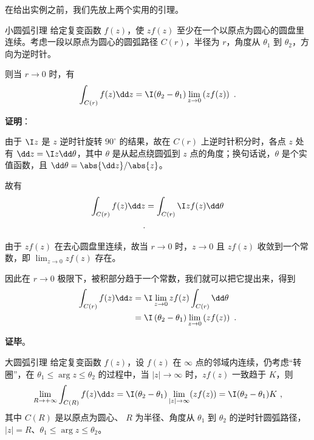 在给出实例之前，我们先放上两个实用的引理。

\begin{lemma}{小圆弧引理}\label{lem_JdLem_1}
给定复变函数 $f(z)$，使 $zf(z)$ 至少在一个以原点为圆心的圆盘里连续。考虑一段以原点为圆心的圆弧路径 $C(r)$，半径为 $r$，角度从 $\theta_1$ 到 $\theta_2$，方向为逆时针。

则当 $r\to 0$ 时，有
\begin{equation}
\int_{C(r)}f(z)\dd z=\I (\theta_2-\theta_1) \lim\limits_{z\to 0}\left(zf(z)\right)~.
\end{equation}

\end{lemma}


\textbf{证明}：

由于 $\I z$ 是 $z$ 逆时针旋转 $90^\circ$ 的结果，故在 $C(r)$ 上逆时针积分时，各点 $z$ 处有 $\dd z=\I z\dd \theta$，其中 $\theta$ 是从起点绕圆弧到 $z$ 点的角度；换句话说，$\theta$ 是个实值函数，且 $\dd \theta=\abs{\dd z}/\abs{z}$。


故有
\begin{equation}
\begin{aligned}
\int_{C(r)}f(z)\dd z&=\int_{C(r)}\I zf(z)\dd \theta\\~.
\end{aligned}
\end{equation}

由于 $zf(z)$ 在去心圆盘里连续，故当 $r\to 0$ 时，$z\to 0$ 且 $zf(z)$ 收敛到一个常数，即 $\lim_{z\to 0}zf(z)$ 存在。

因此在 $r\to 0$ 极限下，被积部分趋于一个常数，我们就可以把它提出来，得到
\begin{equation}
\begin{aligned}
\int_{C(r)}f(z)\dd z&=\I \lim_{z\to 0}zf(z)\int_{C(r)}\dd \theta\\
&=\I \left(\theta_2-\theta_1 \right) \lim_{z\to 0}\left(zf(z)\right)~.
\end{aligned}
\end{equation}

\textbf{证毕}。










\begin{lemma}{大圆弧引理}
给定复变函数 $f(z)$，设 $f(z)$ 在 $\infty$ 点的邻域内连续，仍考虑“转圈”，在 $\theta_1 \le \arg z \le \theta_2$ 的过程中，当 $|z| \rightarrow \infty$ 时，$z f(z)$ 一致趋于 $K$，则
\begin{equation}
\lim_{R \rightarrow +\infty} \int_{C(R)} f(z) \dd z = \I (\theta_2 - \theta_1) \lim_{|z| \rightarrow \infty} (z f(z)) =  \I (\theta_2 - \theta_1) K ~,
\end{equation}
其中 $C(R)$ 是以原点为圆心、 $R$ 为半径、角度从 $\theta_1$ 到 $\theta_2$ 的逆时针圆弧路径，$|z| = R$、$\theta_1 \le \arg z \le \theta_2$。
\end{lemma}


